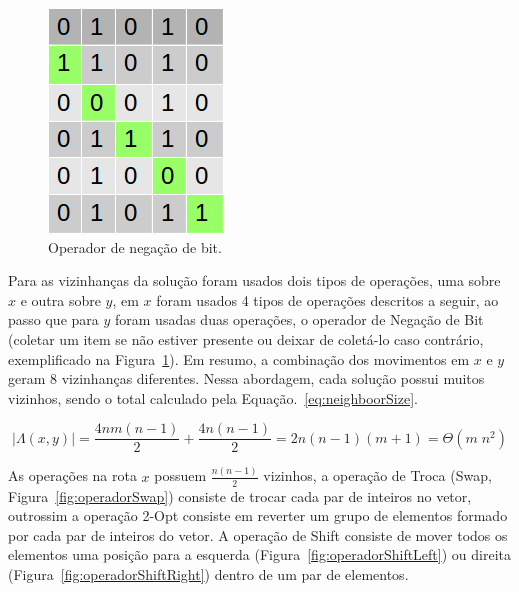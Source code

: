 \begin{figure}[htbp]
    \centerline{\includegraphics[scale=0.4]{figuras/pmv/notBit.png}}
    \caption{Operador de negação de bit.}
    \label{fig:operadorNegacaoBit}
\end{figure}

Para as vizinhanças da solução foram usados dois tipos de operações, uma sobre $x$ e outra sobre $y$, em $x$ foram usados 4 tipos de operações descritos a seguir, ao passo que para $y$ foram usadas duas operações, o operador de Negação de Bit (coletar um item se não estiver presente ou deixar de coletá-lo caso contrário, exemplificado na Figura~\ref{fig:operadorNegacaoBit}).
Em resumo, a combinação dos movimentos em $x$ e $y$ geram 8 vizinhanças diferentes.
Nessa abordagem, cada solução possui muitos vizinhos, sendo o total calculado pela Equação.~\eqref{eq:neighboorSize}.

\begin{equation} \label{eq:neighboorSize}
    |\Lambda(x, y)| = \frac{4nm(n - 1)}{2} + \frac{4n(n - 1)}{2} = 2n(n - 1)(m + 1) = \Theta(m\;n^2)
\end{equation}

\label{subsec:localSerach:neighborhoods}
As operações na rota $x$ possuem $\frac{n (n -1)}{2}$ vizinhos, a operação de Troca (Swap, Figura~\ref{fig:operadorSwap}) consiste de trocar cada par de inteiros no vetor, outrossim a operação 2-Opt consiste em reverter um grupo de elementos formado por cada par de inteiros do vetor.
A operação de Shift consiste de mover todos os elementos uma posição para a esquerda (Figura~\ref{fig:operadorShiftLeft}) ou direita (Figura~\ref{fig:operadorShiftRight}) dentro de um par de elementos.

